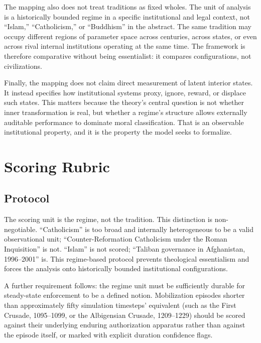 \documentclass[12pt]{article}
\begin{document}
The mapping also does not treat traditions as fixed wholes. The unit of analysis is a historically bounded regime in a specific institutional and legal context, not ``Islam,'' ``Catholicism,'' or ``Buddhism'' in the abstract. The same tradition may occupy different regions of parameter space across centuries, across states, or even across rival internal institutions operating at the same time. The framework is therefore comparative without being essentialist: it compares configurations, not civilizations.

Finally, the mapping does not claim direct measurement of latent interior states. It instead specifies how institutional systems proxy, ignore, reward, or displace such states. This matters because the theory's central question is not whether inner transformation is real, but whether a regime's structure allows externally auditable performance to dominate moral classification. That is an observable institutional property, and it is the property the model seeks to formalize.



\section{Scoring Rubric}

\subsection{Protocol}

The scoring unit is the regime, not the tradition. This distinction is non-negotiable. ``Catholicism'' is too broad and internally heterogeneous to be a valid observational unit; ``Counter-Reformation Catholicism under the Roman Inquisition'' is not. ``Islam'' is not scored; ``Taliban governance in Afghanistan, 1996--2001'' is. This regime-based protocol prevents theological essentialism and forces the analysis onto historically bounded institutional configurations.

A further requirement follows: the regime unit must be sufficiently durable for steady-state enforcement to be a defined notion. Mobilization episodes shorter than approximately fifty simulation timesteps' equivalent (such as the First Crusade, 1095--1099, or the Albigensian Crusade, 1209--1229) should be scored against their underlying enduring authorization apparatus rather than against the episode itself, or marked with explicit duration confidence flags.
\end{document}
